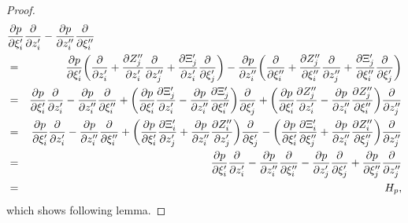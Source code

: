 \documentclass[10pt, a4paper, twoside]{amsart}
\numberwithin{equation}{section}
\theoremstyle{remark}
\begin{document}
\begin{appendix}
\begin{proof}
\begin{eqnarray*}
	\lefteqn{\frac{\partial p}{\partial \xi^\prime_i} \frac{\partial}{\partial z^\prime_i} -  \frac{\partial p}{\partial z_i^{\prime\prime}} \frac{\partial}{\partial \xi^{\prime\prime}_i}}\\ &=&   \frac{\partial p}{\partial \xi^\prime_i} \bigg(\frac{\partial}{\partial z_i^\prime} + \frac{\partial Z_j^{\prime\prime}}{\partial z_i^{\prime}} \frac{\partial}{\partial z_j^{\prime\prime}} + \frac{\partial \Xi^\prime_j}{\partial z_i^\prime} \frac{\partial}{\partial \xi_j^\prime}\bigg)   -  \frac{\partial p}{\partial z_i^{\prime\prime}} \bigg(\frac{\partial}{\partial \xi_i^{\prime\prime}} + \frac{\partial Z_j^{\prime\prime}}{\partial \xi_i^{\prime\prime}} \frac{\partial}{\partial z_j^{\prime\prime}} + \frac{\partial \Xi^\prime_j}{\partial \xi_i^{\prime\prime}} \frac{\partial}{\partial \xi_j^\prime}\bigg)\\  &=&  \frac{\partial p}{\partial \xi^\prime_i} \frac{\partial}{\partial z_i^\prime} -  \frac{\partial p}{\partial z_i^{\prime\prime}} \frac{\partial}{\partial \xi_i^{\prime\prime}} + \bigg(\frac{\partial p}{\partial \xi^\prime_i} \frac{\partial \Xi^\prime_j}{\partial z_i^\prime}  - \frac{\partial p}{\partial z_i^{\prime\prime}} \frac{\partial \Xi^\prime_j}{\partial \xi_i^{\prime\prime}} \bigg) \frac{\partial}{\partial \xi_j^\prime}  + \bigg(\frac{\partial p}{\partial \xi^\prime_i} \frac{\partial Z_j^{\prime\prime}}{\partial z_i^{\prime}}  -  \frac{\partial p}{\partial z_i^{\prime\prime}}  \frac{\partial Z_j^{\prime\prime}}{\partial \xi_i^{\prime\prime}}  \bigg)\frac{\partial}{\partial z_j^{\prime\prime}}\\   &=&  \frac{\partial p}{\partial \xi^\prime_i} \frac{\partial}{\partial z_i^\prime} -  \frac{\partial p}{\partial z_i^{\prime\prime}} \frac{\partial}{\partial \xi_i^{\prime\prime}} + \bigg(\frac{\partial p}{\partial \xi^\prime_i} \frac{\partial \Xi^\prime_i}{\partial z_j^\prime}  + \frac{\partial p}{\partial z_i^{\prime\prime}} \frac{\partial Z^{\prime\prime}_i}{\partial z_j^{\prime}} \bigg) \frac{\partial}{\partial \xi_j^\prime}  - \bigg(\frac{\partial p}{\partial \xi^\prime_i} \frac{\partial \Xi_i^{\prime}}{\partial \xi_j^{\prime\prime}}  +  \frac{\partial p}{\partial z_i^{\prime\prime}}  \frac{\partial Z_i^{\prime\prime}}{\partial \xi_j^{\prime\prime}}  \bigg)\frac{\partial}{\partial z_j^{\prime\prime}}\\   &=&  \frac{\partial p}{\partial \xi^\prime_i} \frac{\partial}{\partial z_i^\prime} -  \frac{\partial p}{\partial z_i^{\prime\prime}} \frac{\partial}{\partial \xi_i^{\prime\prime}} - \frac{\partial p}{\partial z_j^\prime}\frac{\partial}{\partial \xi_j^\prime}  + \frac{\partial p}{\partial \xi^{\prime\prime}_j} \frac{\partial}{\partial z_j^{\prime\prime}}\\ &=& H_p,
	\end{eqnarray*} which shows following lemma.
	

\end{proof}
\end{appendix}
\end{document}
